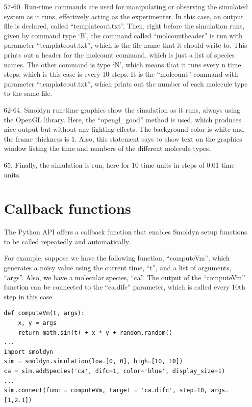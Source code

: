 \documentclass {book}
\begin{document}
\begin{description}
\item{57-60.} Run-time commands are used for manipulating or observing the simulated system as it runs, effectively acting as the experimenter. In this case, an output file is declared, called ``templateout.txt''. Then, right before the simulation runs, given by command type `B', the command called ``molcountheader'' is run with parameter ``templateout.txt'', which is the file name that it should write to. This prints out a header for the molcount command, which is just a list of species names. The other command is type `N', which means that it runs every n time steps, which is this case is every 10 steps. It is the ``molcount'' command with parameter ``templateout.txt'', which prints out the number of each molecule type to the same file.

\item{62-64.} Smoldyn run-time graphics show the simulation as it runs, always using the OpenGL library. Here, the ``opengl\_good'' method is used, which produces nice output but without any lighting effects. The background color is white and the frame thickness is 1. Also, this statement says to show text on the graphics window listing the time and numbers of the different molecule types.

\item{65.} Finally, the simulation is run, here for 10 time units in steps of 0.01 time units.

\end{description}

\section{Callback functions}

The Python API offers a callback function that enables Smoldyn setup functions to be called repeatedly and automatically.

For example, suppose we have the following function, ``computeVm'', which generates a noisy value using the current time, ``t'', and a list of arguments, ``args''. Also, we have a molecular species, ``ca''. The output of the ``computeVm'' function can be connected to the ``ca.difc'' parameter, which is called every 10th step in this case.

\begin{lstlisting}[style=SSAPython]
def computeVm(t, args):
    x, y = args 
    return math.sin(t) + x * y + random.random()
...
import smoldyn
sim = smoldyn.simulation(low=[0, 0], high=[10, 10])
ca = sim.addSpecies('ca', difc=1, color='blue', display_size=1)
...
sim.connect(func = computeVm, target = 'ca.difc', step=10, args=[1,2.1])
\end{lstlisting}
\end{document}
